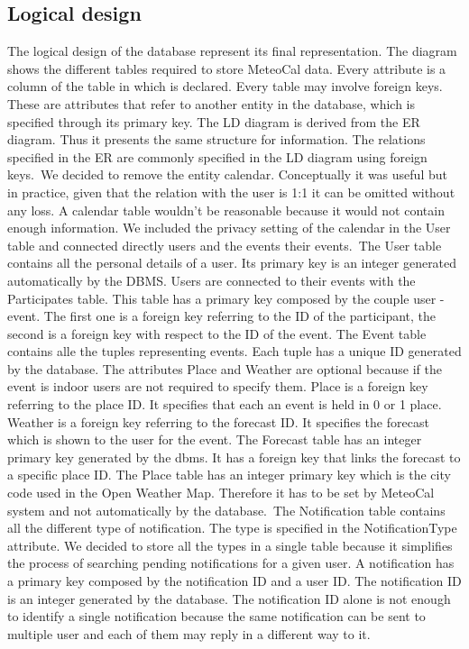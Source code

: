 \documentclass[10pt,a4paper,titlepage]{article}
\begin{document}
\subsection{Logical design}
The logical design of the database represent its final representation. The diagram shows the different tables required to store MeteoCal data. Every attribute is a column of the table in which is declared. Every table may involve foreign keys. These are attributes that refer to another entity in the database, which is specified through its primary key. 
The LD diagram is derived from the ER diagram. Thus it presents the same structure for information. The relations specified in the ER are commonly specified in the LD diagram using foreign keys.\
We decided to remove the entity calendar. Conceptually it was useful but in practice, given that the relation with the user is 1:1 it can be omitted without any loss. A calendar table wouldn’t be reasonable because it would not contain enough information. We included the privacy setting of the calendar in the User table and connected directly users and the events their events.\
The User table contains all the personal details of a user. Its primary key is an integer generated automatically by the DBMS. 
Users are connected to their events with the Participates table. This table has a primary key composed by the couple user - event. The first one is a foreign key referring to the ID of the participant, the second is a foreign key with respect to the ID of the event.
The Event table contains alle the tuples representing events. Each tuple has a unique ID generated by the database. The attributes Place and Weather are optional because if the event is indoor users are not required to specify them. Place is a foreign key referring to the place ID. It specifies that each an event is held in 0 or 1 place. Weather is a foreign key referring to the forecast ID. It specifies the forecast which is shown to the user for the event.
The Forecast table has an integer primary key generated by the dbms. It has a foreign key that links the forecast to a specific place ID. 
The Place table has an integer primary key which is the city code used in the Open Weather Map. Therefore it has to be set by MeteoCal system and not automatically by the database.\
The Notification table contains all the different type of notification. The type is specified in the NotificationType attribute. We decided to store all the types in a single table because it simplifies the process of searching pending notifications for a given user. A notification has a primary key composed by the notification ID and a user ID. The notification ID is an integer generated by the database. The notification ID alone is not enough to identify a single notification because the same notification can be sent to multiple user and each of them may reply in a different way to it.\
\end{document}
